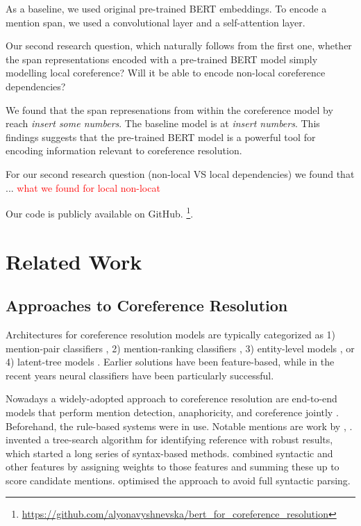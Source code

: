 \documentclass[11pt]{article}
\newcommand\todo[1]{\textcolor{red}{#1}}
\begin{document}
As a baseline, we used original pre-trained BERT embeddings. To encode a mention span,  we used a convolutional layer and a  self-attention layer.

Our second research question, which naturally follows from the first one, whether the span representations encoded with a pre-trained BERT model simply modelling local coreference? Will it be able to encode non-local coreference dependencies? 

We found that the span represenations from within the coreference model by \textcite{joshi2019coref} reach \textit{insert some numbers}. The baseline model is at \textit{insert numbers}. This findings suggests that the pre-trained BERT model is a powerful tool for encoding information relevant to coreference resolution. 

For our second research question (non-local VS local dependencies) we found that ... \todo{what we found for local non-locat}

Our code is publicly available on GitHub.  \footnote{\url{https://github.com/alyonavyshnevska/bert_for_coreference_resolution}}.


\section{Related Work}

\subsection{Approaches to Coreference Resolution}

Architectures for coreference resolution models are typically categorized as 1) mention-pair classifiers \parencite{ng2002identifying, bengtson2008understanding}, 2) mention-ranking classifiers \parencite{durrett2013easy, wiseman2015learning, clark2016deep}, 3) entity-level models \parencite{haghighi-klein-2010-coreference, wiseman-etal-2016-learning}, or 4) latent-tree models \parencite{fernandes-etal-2012-latent, martschat-strube-2015-latent}.
Earlier solutions have been feature-based, while in the recent years neural classifiers have been particularly successful.

Nowadays a widely-adopted approach to coreference resolution are end-to-end models that perform mention detection, anaphoricity, and coreference jointly \parencite{jurafsky2019}. Beforehand, the rule-based systems were in use. Notable mentions are work by \textcite{hobbs1978}, \textcite{lappin1994}. \textcite{hobbs1978} invented a tree-search algorithm for identifying reference with robust results, which started a long series of syntax-based methods.  \textcite{lappin1994} combined syntactic and other features by assigning weights to those features and summing these up to score candidate mentions. \textcite{kennedy1996} optimised the approach to avoid full syntactic parsing. 
\end{document}
